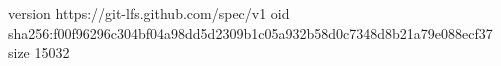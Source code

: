 version https://git-lfs.github.com/spec/v1
oid sha256:f00f96296c304bf04a98dd5d2309b1c05a932b58d0c7348d8b21a79e088ecf37
size 15032
